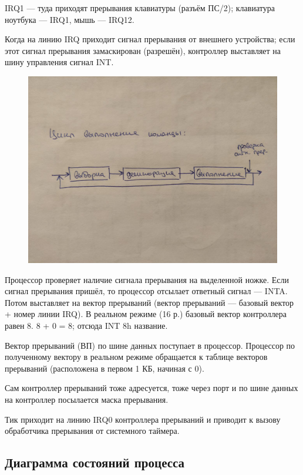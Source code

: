 IRQ1 --- туда приходят прерывания клавиатуры (разъём ПС/2); клавиатура ноутбука --- IRQ1, мышь --- IRQ12.

Когда на линию IRQ приходит сигнал прерывания от внешнего устройства; если этот сигнал прерывания замаскирован (разрешён), контроллер выставляет на шину управления сигнал INT.

\begin{figure}[H]
	\centering
	\includegraphics[width=\textwidth]{img/tables/07.jpg}
\end{figure}

Процессор проверяет наличие сигнала прерывания на выделенной ножке.
Если сигнал прерывания пришёл, то процессор отсылает ответный сигнал --- INTA.
Потом выставляет на вектор прерываний (вектор прерываний --- базовый вектор + номер линии IRQ).
В реальном режиме (16 р.) базовый вектор контроллера равен 8.
8 + 0 = 8; отсюда INT 8h название.

Вектор прерываний (ВП) по шине данных поступает в процессор.
Процессор по полученному вектору в реальном режиме обращается к таблице векторов прерываний (расположена в первом 1 КБ, начиная с 0).

Сам контроллер прерываний тоже адресуется, тоже через порт и по шине данных на контроллер посылается маска прерывания.

Тик приходит на линию IRQ0 контроллера прерываний и приводит к вызову обработчика прерывания от системного таймера.

\subsection{Диаграмма состояний процесса}


